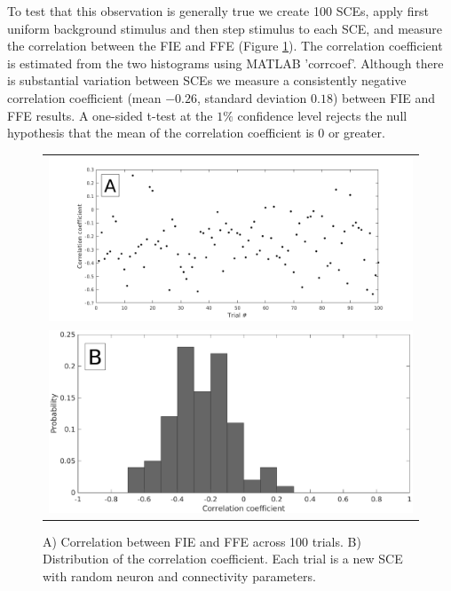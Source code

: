 To test that this observation is generally true we create 100 SCEs, apply first uniform background stimulus and then step stimulus to each SCE, and measure the correlation between the FIE and FFE (Figure \ref{fig:InitiationCorrelation}).
The correlation coefficient is estimated from the two histograms using MATLAB 'corrcoef'.  
Although there is substantial variation between SCEs we measure a consistently negative correlation coefficient (mean $-0.26$, standard deviation $0.18$) between FIE and FFE results.
A one-sided t-test at the $1\%$ confidence level rejects the null hypothesis that the mean of the correlation coefficient is $0$ or greater.
\begin{figure}[!htb]
 \centering
 \begin{tabular}{c}
     \includegraphics[width=\textwidth]{fig/InitiationCorrelation} \\ 
     \includegraphics[width=\textwidth]{fig/InitiationCorrelationPDF} 
 \end{tabular}
 \caption{ A) Correlation between FIE and FFE across 100 trials. B) Distribution of the correlation coefficient. Each trial is a new SCE with random neuron and connectivity parameters. }
 \label{fig:InitiationCorrelation}
\end{figure}

